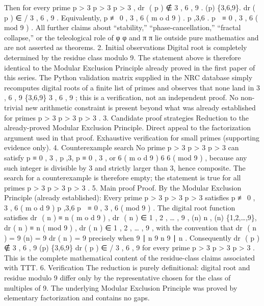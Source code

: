 {{{{{{Then for every prime
p
>
3
p > 3
p
>
3
,
dr
⁡
(
p
)
∉
{
3
,
6
,
9
}
.
(p) \notin \{3,6,9\}.
dr
(
p
)
∈
/
{
3
,
6
,
9
}
.
Equivalently,
p
≢
0
,
3
,
6
(
m
o
d
9
)
.
p \not{},3,6 .
p

≡
0
,
3
,
6
(
mod
9
)
.
All further claims about “stability,” “phase-cancellation,” “fractal collapse,” or the teleological role of
φ
\varphi
φ
and
π
\pi
π
lie outside pure mathematics and are not asserted as theorems.
2. Initial observations
Digital root is completely determined by the residue class modulo 9.
The statement above is therefore identical to the Modular Exclusion Principle already proved in the first paper of this series.
The Python validation matrix supplied in the NRC database simply recomputes digital roots of a finite list of primes and observes that none land in
{
3
,
6
,
9
}
\{3,6,9\}
{
3
,
6
,
9
}
; this is a verification, not an independent proof.
No non-trivial new arithmetic constraint is present beyond what was already established for primes
p
>
3
p > 3
p
>
3
.
3. Candidate proof strategies
Reduction to the already-proved Modular Exclusion Principle.
Direct appeal to the factorization argument used in that proof.
Exhaustive verification for small primes (supporting evidence only).
4. Counterexample search
No prime
p
>
3
p > 3
p
>
3
can satisfy
p
≡
0
,
3
,
p ,3,
p
≡
0
,
3
,
or
6
(
m
o
d
9
)
6 
6
(
mod
9
)
, because any such integer is divisible by 3 and strictly larger than 3, hence composite.
The search for a counterexample is therefore empty; the statement is true for all primes
p
>
3
p > 3
p
>
3
.
5. Main proof
Proof.
By the Modular Exclusion Principle (already established):
Every prime
p
>
3
p > 3
p
>
3
satisfies
p
≢
0
,
3
,
6
(
m
o
d
9
)
p \not{},3,6 
p

≡
0
,
3
,
6
(
mod
9
)
.
The digital root function satisfies
dr
⁡
(
n
)
≡
n
(
m
o
d
9
)
,
dr
⁡
(
n
)
∈
{
1
,
2
,
…
,
9
}
,
(n) \equiv n , \qquad
{}(n) \in \{1,2,\dots,9\},
dr
(
n
)
≡
n
(
mod
9
)
,
dr
(
n
)
∈
{
1
,
2
,
…
,
9
}
,
with the convention that
dr
⁡
(
n
)
=
9
(n) = 9
dr
(
n
)
=
9
precisely when
9
∣
n
9 \mid n
9
∣
n
.
Consequently
dr
⁡
(
p
)
∉
{
3
,
6
,
9
}
(p) \notin \{3,6,9\}
dr
(
p
)
∈
/
{
3
,
6
,
9
}
for every prime
p
>
3
p > 3
p
>
3
.
This is the complete mathematical content of the residue-class claims associated with TTT.
6. Verification
The reduction is purely definitional: digital root and residue modulo 9 differ only by the representative chosen for the class of multiples of 9.
The underlying Modular Exclusion Principle was proved by elementary factorization and contains no gaps.
}}}}}}
